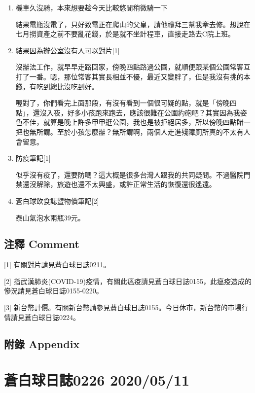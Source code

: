 \documentclass[a5paper, 12pt
]{book}
\begin{document}
\begin{enumerate}
\def\labelenumi{\arabic{enumi}.}
\item
  機車久沒騎，本來想要趁今天比較悠閒稍微騎一下

  結果電瓶沒電了，只好致電正在爬山的父皇，請他禮拜三幫我牽去修。想說在七月撈資產之前不要亂花錢，於是就不坐計程車，直接走路去C院上班。
\item
  結果因為辦公室沒有人可以對片{[}1{]}

  沒辦法工作，就早早走路回家，傍晚四點路過公園，就順便跟某個公園常客互打了一番。嗯，那位常客其實長相並不優，最近又變胖了，但是我沒有挑的本錢，有吃到總比沒吃到好。

  喔對了，你們看完上面那段，有沒有看到一個很可疑的點，就是「傍晚四點」，還沒入夜，好多小孩跑來跑去，應該很難在公園約砲吧？其實因為我姿色不佳，就算是晚上許多甲甲逛公園，我也是被拒絕居多，所以傍晚四點賭一把也無所謂。至於小孩怎麼辦？無所謂啊，兩個人走進殘障廁所真的不太有人會留意。
\item
  防疫筆記{[}1{]}

  似乎沒有疫了，還要防嗎？這大概是很多台灣人跟我的共同疑問。不過醫院門禁還沒解除，旅遊也還不太興盛，或許正常生活的恢復還很遙遠。
\item
  蒼白球飲食誌暨物價筆記{[}2{]}

  泰山氣泡水兩瓶39元。
\end{enumerate}

\hypertarget{ux6ce8ux91cb-comment-70}{%
\subsection{注釋 Comment}\label{ux6ce8ux91cb-comment-70}}

{[}1{]} 有關對片請見蒼白球日誌0211。

{[}2{]}
指武漢肺炎(COVID-19)疫情，有關此瘟疫請見蒼白球日誌0155，此瘟疫造成的慘況請見蒼白球日誌0155-0220。

{[}3{]}
新台幣計價。有關新台幣請參見蒼白球日誌0155。今日休市，新台幣的市場行情請見蒼白球日誌0224。

\hypertarget{ux9644ux9304-appendix-70}{%
\subsection{附錄 Appendix}\label{ux9644ux9304-appendix-70}}

\hypertarget{ux84bcux767dux7403ux65e5ux8a8c0226-20200511}{%
\section{蒼白球日誌0226
2020/05/11}\label{ux84bcux767dux7403ux65e5ux8a8c0226-20200511}}
\end{document}
